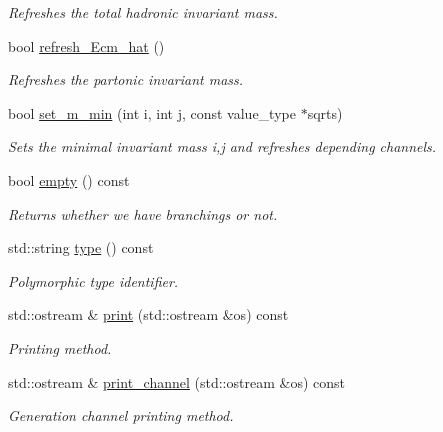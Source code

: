 \begin{DoxyCompactItemize}
\begin{DoxyCompactList}\small\item\em Refreshes the total hadronic invariant mass. \end{DoxyCompactList}\item 
\hypertarget{a00458_a9208baae59912917f21c2c2797cdf93c}{}bool \hyperlink{a00458_a9208baae59912917f21c2c2797cdf93c}{refresh\+\_\+\+Ecm\+\_\+hat} ()\label{a00458_a9208baae59912917f21c2c2797cdf93c}

\begin{DoxyCompactList}\small\item\em Refreshes the partonic invariant mass. \end{DoxyCompactList}\item 
\hypertarget{a00458_a7321db9efda55ade5f9bf338c34fc97c}{}bool \hyperlink{a00458_a7321db9efda55ade5f9bf338c34fc97c}{set\+\_\+m\+\_\+min} (int i, int j, const value\+\_\+type $\ast$sqrts)\label{a00458_a7321db9efda55ade5f9bf338c34fc97c}

\begin{DoxyCompactList}\small\item\em Sets the minimal invariant mass i,j and refreshes depending channels. \end{DoxyCompactList}\item 
\hypertarget{a00458_a078a8aece3570dd7af51084be0ad9db1}{}bool \hyperlink{a00458_a078a8aece3570dd7af51084be0ad9db1}{empty} () const \label{a00458_a078a8aece3570dd7af51084be0ad9db1}

\begin{DoxyCompactList}\small\item\em Returns whether we have branchings or not. \end{DoxyCompactList}\item 
\hypertarget{a00458_a52a8cf9dd87c8514494a6b94baf89367}{}std\+::string \hyperlink{a00458_a52a8cf9dd87c8514494a6b94baf89367}{type} () const \label{a00458_a52a8cf9dd87c8514494a6b94baf89367}

\begin{DoxyCompactList}\small\item\em Polymorphic type identifier. \end{DoxyCompactList}\item 
\hypertarget{a00458_aa142230016b0f94779e8dcfae9c96ecb}{}std\+::ostream \& \hyperlink{a00458_aa142230016b0f94779e8dcfae9c96ecb}{print} (std\+::ostream \&os) const \label{a00458_aa142230016b0f94779e8dcfae9c96ecb}

\begin{DoxyCompactList}\small\item\em Printing method. \end{DoxyCompactList}\item 
\hypertarget{a00458_a704355be32360cc8c4a3819ee7051422}{}std\+::ostream \& \hyperlink{a00458_a704355be32360cc8c4a3819ee7051422}{print\+\_\+channel} (std\+::ostream \&os) const \label{a00458_a704355be32360cc8c4a3819ee7051422}

\begin{DoxyCompactList}\small\item\em Generation channel printing method. \end{DoxyCompactList}\end{DoxyCompactItemize}
